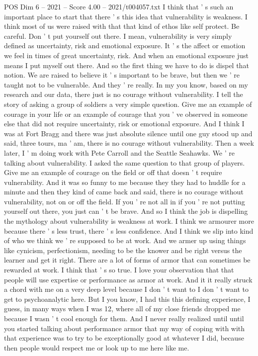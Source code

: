 \begin{textsample}{POS Dim 6 – 2021 – Score 4.00 – 2021/t004057.txt}
I think that ' s such an important place to start that there ' s this idea that vulnerability is weakness.
I think most of us were raised with that that kind of ethos like self protect.
Be careful.
Don ' t put yourself out there.
I mean, vulnerability is very simply defined as uncertainty, risk and emotional exposure.
It ' s the affect or emotion we feel in times of great uncertainty, risk.
And when an emotional exposure just means I put myself out there.
And so the first thing we have to do is dispel that notion.
We are raised to believe it ' s important to be brave, but then we ' re taught not to be vulnerable.
And they ' re really.
In my you know, based on my research and our data, there just is no courage without vulnerability.
I tell the story of asking a group of soldiers a very simple question.
Give me an example of courage in your life or an example of courage that you ' ve observed in someone else that did not require uncertainty, risk or emotional exposure.
And I think I was at Fort Bragg and there was just absolute silence until one guy stood up and said, three tours, ma ' am, there is no courage without vulnerability.
Then a week later, I ' m doing work with Pete Carroll and the Seattle Seahawks.
We ' re talking about vulnerability.
I asked the same question to that group of players.
Give me an example of courage on the field or off that doesn ' t require vulnerability.
And it was so funny to me because they they had to huddle for a minute and then they kind of came back and said, there is no courage without vulnerability, not on or off the field.
If you ' re not all in if you ' re not putting yourself out there, you just can ' t be brave.
And so I think the job is dispelling the mythology about vulnerability is weakness at work.
I think we armourer more because there ' s less trust, there ' s less confidence.
And I think we slip into kind of who we think we ' re supposed to be at work.
And we armer up using things like cynicism, perfectionism, needing to be the knower and be right versus the learner and get it right.
There are a lot of forms of armor that can sometimes be rewarded at work.
I think that ' s so true.
I love your observation that that people will use expertise or performance as armor at work.
And it it really struck a chord with me on a very deep level because I don ' t want to I don ' t want to get to psychoanalytic here.
But I you know, I had this this defining experience, I guess, in many ways when I was 12, where all of my close friends dropped me because I wasn ' t cool enough for them.
And I never really realized until until you started talking about performance armor that my way of coping with with that experience was to try to be exceptionally good at whatever I did, because then people would respect me or look up to me here like me.

\end{textsample}
